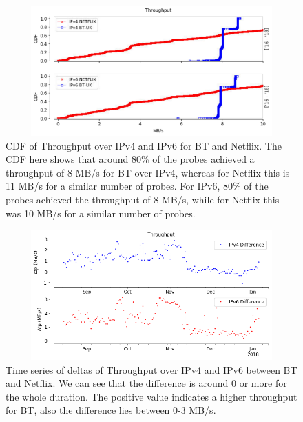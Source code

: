 \begin{figure}[!ht]
	\centering
	\includegraphics[keepaspectratio, height=5cm, width=15cm]{figures/cache/btuk/netflix-throughput-difference-2856-separate.pdf}
	\caption[BT-UK Throughput CDF Absolute]{CDF of Throughput over IPv4 and IPv6 for BT and Netflix. The CDF here shows that around 80\% of the probes achieved a throughput of 8 MB/s for BT over IPv4, whereas for Netflix this is 11 MB/s
for a similar number of probes. For IPv6, 80\% of the probes achieved the throughput of 8 MB/s, while for Netflix this was 10 MB/s for a similar number of probes.}
	\label{fig:BT-UK Throughput CDF Absolute}
\end{figure}

\FloatBarrier

\begin{figure}[!ht]
	\centering
	\includegraphics[keepaspectratio, height=5cm, width=15cm]{figures/cache/btuk/netflix-throughput-timeseries-asn-2856.png}
	\caption[BT-UK Throughput Timeseries Deltas]{Time series of deltas of Throughput over IPv4 and IPv6 between BT and Netflix. We can see that the difference is around 0 or more for the whole duration. 
The positive value indicates a higher throughput for BT, also the difference lies between 0-3 MB/s.}
	\label{fig:BT-UK Throughput Timeseries Deltas}
\end{figure}

